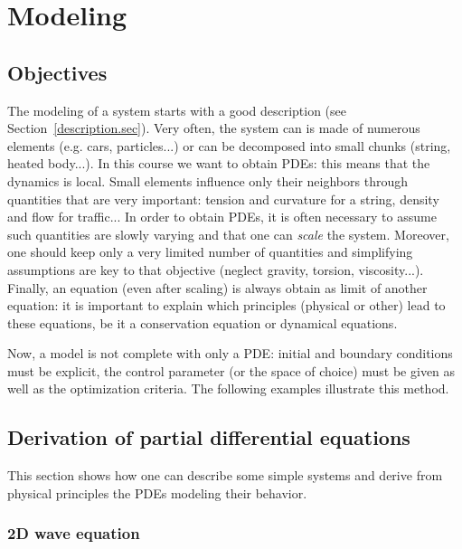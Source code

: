 \thispagestyle{empty}
\chapter{Modeling}
\label{modeling.chap}

\section{Objectives}

The modeling of a system starts with a good description (see Section~\ref{description.sec}). Very often, the system can is made of numerous elements (e.g. cars, particles...) or can be decomposed into small chunks (string, heated body...). In this course we want to obtain PDEs: this means that the dynamics is local. Small elements influence only their neighbors through quantities that are very important: tension and curvature for a string, density and flow for traffic... In order to obtain PDEs, it is often necessary to assume such quantities are slowly varying and that one can \emph{scale} the system. Moreover, one should keep only a very limited number of quantities and simplifying assumptions are key to that objective (neglect gravity, torsion, viscosity...). Finally, an equation (even after scaling) is always obtain as limit of another equation: it is important to explain which principles (physical or other) lead to these equations, be it a conservation equation or dynamical equations.

Now, a model is not complete with only a PDE: initial and boundary conditions must be explicit, the control parameter (or the space of choice) must be given as well as the optimization criteria. The following examples illustrate this method. 

\section{Derivation of partial differential equations}
This section shows how one can describe some simple systems and derive from physical principles the PDEs modeling their behavior.

\subsection{2D wave equation}


